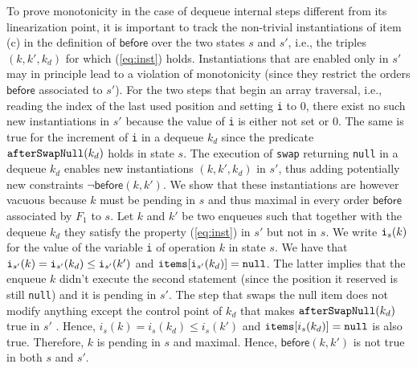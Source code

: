 To prove monotonicity in the case of dequeue internal steps different from its linearization point, it is important to track the non-trivial instantiations of item (c) in the definition of $\mathsf{before}$ over the two states $s$ and $s'$, i.e., the triples $(k,k',k_d)$ for which (\ref{eq:inst}) holds. Instantiations that are enabled only in $s'$ may in principle lead to a violation of monotonicity (since they restrict the orders $\mathsf{before}$ associated to $s'$). For the two steps that begin an array traversal, i.e., reading the index of the last used position and setting {\tt i} to $0$, there exist no  such new instantiations in $s'$ because the value of {\tt i} is either not set or $0$. %
%
%
%
%
The same is true for the increment of {\tt i} in a dequeue $k_d$ since the predicate ${\tt afterSwapNull}(k_d)$ holds in state $s$.
The execution of {\tt swap} returning {\tt null} in a dequeue $k_d$ enables new instantiations $(k,k',k_d)$ in $s'$, thus adding potentially new constraints $\neg \mathsf{before}(k,k')$. We show that these instantiations are however vacuous because $k$ must be pending in $s$ and thus maximal in every order $\mathsf{before}$ associated by $F_1$ to $s$.
Let $k$ and $k'$ be two enqueues such that together with the dequeue $k_d$ they satisfy the property (\ref{eq:inst}) in $s'$ but not in $s$. 
We write ${\tt i}_s(k)$ for the value of the variable {\tt i} of operation $k$ in state $s$. 
We have that ${\tt i}_{s'}(k) = {\tt i}_{s'}(k_d) \leq {\tt i}_{s'}(k')$ and ${\tt items}[{\tt i}_{s'}(k_d)]={\tt null}$. The latter implies that the enqueue $k$ didn't execute
the second statement (since the position it reserved is still {\tt null}) and it is pending in $s'$. The step that swaps the null item does not modify anything except the control point of $k_d$ that makes ${\tt afterSwapNull}(k_d)$ true in $s'$ . Hence, $i_s(k) = i_s(k_d)\leq i_s(k')$ and ${\tt items}[i_s(k_d)] = {\tt null}$ is also true. Therefore, $k$ is pending in $s$ and maximal. Hence, $\mathsf{before}(k,k')$ is not true in both $s$ and $s'$. 

